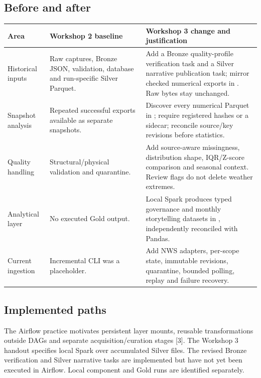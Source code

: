 \documentclass[10pt]{article}
\begin{document}
\subsection{Before and after}
\begin{tabularx}{\textwidth}{L{2.8cm}YY}
\toprule
Area & Workshop 2 baseline & Workshop 3 change and justification\\
\midrule
Historical inputs & Raw captures, Bronze JSON, validation, database and run-specific Silver Parquet. & Add a Bronze quality-profile verification task and a Silver narrative publication task; mirror checked numerical exports in . Raw bytes stay unchanged.\\
Snapshot analysis & Repeated successful exports available as separate snapshots. & Discover every numerical Parquet in ; require registered hashes or a sidecar; reconcile source/key revisions before statistics.\\
Quality handling & Structural/physical validation and quarantine. & Add source-aware missingness, distribution shape, IQR/Z-score comparison and seasonal context. Review flags do not delete weather extremes.\\
Analytical layer & No executed Gold output. & Local Spark produces typed governance and monthly storytelling datasets in , independently reconciled with Pandas.\\
Current ingestion & Incremental CLI was a placeholder. & Add NWS adapters, per-scope state, immutable revisions, quarantine, bounded polling, replay and failure recovery.\\
\bottomrule
\end{tabularx}

\subsection{Implemented paths}
The Airflow practice motivates persistent layer mounts, reusable transformations
outside DAGs and separate acquisition/curation stages [3]. The Workshop 3 handout
specifies local Spark over accumulated Silver files. The revised Bronze
verification and Silver narrative tasks are implemented but have not yet been
executed in Airflow. Local component and Gold runs are identified separately.
\end{document}
